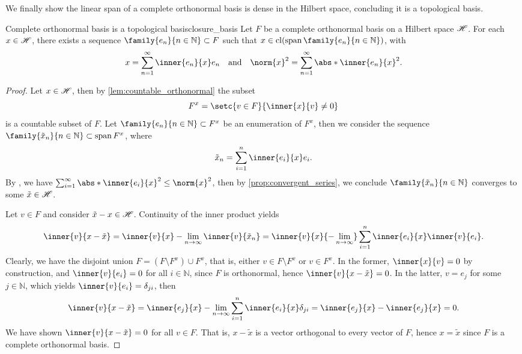 We finally show the linear span of a complete orthonormal basis is dense in the Hilbert space, concluding it is a topological basis.
\begin{theorem}{Complete orthonormal basis is a topological basis}{closure_basis}
    Let \(F\) be a complete orthonormal basis on a Hilbert space \(\mathscr{H}\). For each \(x \in \mathscr{H}\), there exists a sequence \(\family{e_n}{n\in \mathbb{N}} \subset F\) such that \(x \in \cl(\lspan \family{e_n}{n\in \mathbb{N}})\), with
    \begin{equation*}
        x = \sum_{n=1}^\infty \inner{e_n}{x} e_n\quad\text{and}\quad
        \norm{x}^2 = \sum_{n=1}^\infty \abs*{\inner{e_n}{x}}^2.
    \end{equation*}
\end{theorem}
\begin{proof}
    Let \(x \in \mathscr{H}\), then by \cref{lem:countable_orthonormal} the subset
    \begin{equation*}
        F^x = \setc{v \in F}{\inner{x}{v} \neq 0}
    \end{equation*}
    is a countable subset of \(F\). Let \(\family{e_n}{n\in \mathbb{N}} \subset F^x\) be an enumeration of \(F^x\), then we consider the sequence \(\family{\tilde{x}_n}{n\in \mathbb{N}} \subset \lspan F^x\), where
    \begin{equation*}
        \tilde{x}_n = \sum_{i=1}^n \inner{e_i}{x}e_i.
    \end{equation*}
    By , we have \(\sum_{i=1}^\infty \abs*{\inner{e_i}{x}}^2 \leq \norm{x}^2\), then by \cref{prop:convergent_series}, we conclude \(\family{\tilde{x}_n}{n\in \mathbb{N}}\) converges to some \(\tilde{x} \in \mathscr{H}\).

    Let \(v \in F\) and consider \(\tilde{x} - x \in \mathscr{H}\). Continuity of the inner product yields
    \begin{equation*}
        \inner{v}{x - \tilde{x}} = \inner{v}{x} - \lim_{n\to\infty}\inner{v}{\tilde{x}_n} = \inner{v}{x}{ - \lim_{n\to\infty}} \sum_{i=1}^n \inner{e_i}{x}\inner{v}{e_i}.
    \end{equation*}
    Clearly, we have the disjoint union \(F = (F \setminus F^x) \cup F^x\), that is, either \(v \in F \setminus F^x\) or \(v \in F^x\). In the former, \(\inner{x}{v} = 0\) by construction, and \(\inner{v}{e_i} = 0\) for all \(i \in \mathbb{N}\), since \(F\) is orthonormal, hence \(\inner{v}{x - \tilde{x}} = 0\). In the latter, \(v = e_j\) for some \(j \in \mathbb{N}\), which yields \(\inner{v}{e_i} = \delta_{ji}\), then
    \begin{equation*}
        \inner{v}{x - \tilde{x}} = \inner{e_j}{x} - \lim_{n\to\infty} \sum_{i=1}^n \inner{e_i}{x} \delta_{ji} = \inner{e_j}{x} - \inner{e_j}{x} = 0.
    \end{equation*}
    We have shown \(\inner{v}{x - \tilde{x}} = 0\) for all \(v \in F\). That is, \(x - \tilde{x}\) is a vector orthogonal to every vector of \(F\), hence \(x = \tilde{x}\) since \(F\) is a complete orthonormal basis.


\end{proof}
